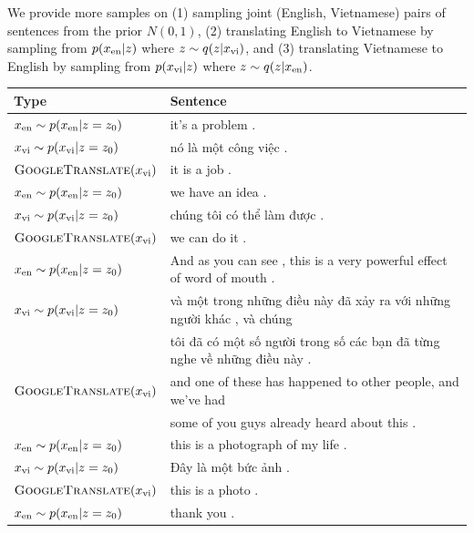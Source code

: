 We provide more samples on (1) sampling joint (English, Vietnamese) pairs of sentences from the prior $N(0,1)$, (2) translating English to Vietnamese by sampling from $p(x_{\textup{en}}|z)$ where $z \sim q(z|x_{\textup{vi}})$, and (3) translating Vietnamese to English by sampling from $p(x_{\textup{vi}}|z)$ where $z \sim q(z|x_{\textup{en}})$. 

\begin{table}
\centering
\scriptsize
\begin{tabular}{ l|l }
  \toprule
  \textbf{Type} & \textbf{Sentence} \\
  \hline
  $x_{\textup{en}} \sim p(x_{\textup{en}}|z=z_0)$ & it's a problem . \\
  $x_{\textup{vi}} \sim p(x_{\textup{vi}}|z=z_0)$ & \foreignlanguage{vietnamese}{nó là một công việc .} \\
  $\textsc{GoogleTranslate}(x_{\textup{vi}})$ & it is a job . \\
  \hline
  $x_{\textup{en}} \sim p(x_{\textup{en}}|z=z_0)$ & we have an idea . \\
  $x_{\textup{vi}} \sim p(x_{\textup{vi}}|z=z_0)$ & \foreignlanguage{vietnamese}{chúng tôi có thể làm được .} \\
  $\textsc{GoogleTranslate}(x_{\textup{vi}})$ & we can do it . \\
  \hline
  $x_{\textup{en}} \sim p(x_{\textup{en}}|z=z_0)$ & And as you can see , this is a very powerful effect of word of mouth . \\
  $x_{\textup{vi}} \sim p(x_{\textup{vi}}|z=z_0)$ & \foreignlanguage{vietnamese}{và một trong những điều này đã xảy ra với những người khác , và chúng} \\
  & \foreignlanguage{vietnamese}{tôi đã có một số người trong số các bạn đã từng nghe về những điều này .} \\
  $\textsc{GoogleTranslate}(x_{\textup{vi}})$ & and one of these has happened to other people, and we've had \\
  & some of you guys already heard about this . \\
  \hline
  $x_{\textup{en}} \sim p(x_{\textup{en}}|z=z_0)$ & this is a photograph of my life . \\
  $x_{\textup{vi}} \sim p(x_{\textup{vi}}|z=z_0)$ & \foreignlanguage{vietnamese}{Đây là một bức ảnh .} \\
  $\textsc{GoogleTranslate}(x_{\textup{vi}})$ & this is a photo . \\
  \hline
  $x_{\textup{en}} \sim p(x_{\textup{en}}|z=z_0)$ & thank you . \\

\end{tabular}
\end{table}
